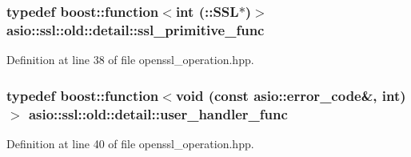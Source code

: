 \subsubsection[{ssl\+\_\+primitive\+\_\+func}]{\setlength{\rightskip}{0pt plus 5cm}typedef boost\+::function$<$int (\+::S\+S\+L$\ast$)$>$ {\bf asio\+::ssl\+::old\+::detail\+::ssl\+\_\+primitive\+\_\+func}}\label{namespaceasio_1_1ssl_1_1old_1_1detail_ac338e0197f7b92011daad86db7d838ba}


Definition at line 38 of file openssl\+\_\+operation.\+hpp.

\hypertarget{namespaceasio_1_1ssl_1_1old_1_1detail_adb21335c4883c670ec54bece575120eb}{}
\subsubsection[{user\+\_\+handler\+\_\+func}]{\setlength{\rightskip}{0pt plus 5cm}typedef boost\+::function$<$void (const {\bf asio\+::error\+\_\+code}\&, int)$>$ {\bf asio\+::ssl\+::old\+::detail\+::user\+\_\+handler\+\_\+func}}\label{namespaceasio_1_1ssl_1_1old_1_1detail_adb21335c4883c670ec54bece575120eb}


Definition at line 40 of file openssl\+\_\+operation.\+hpp.

